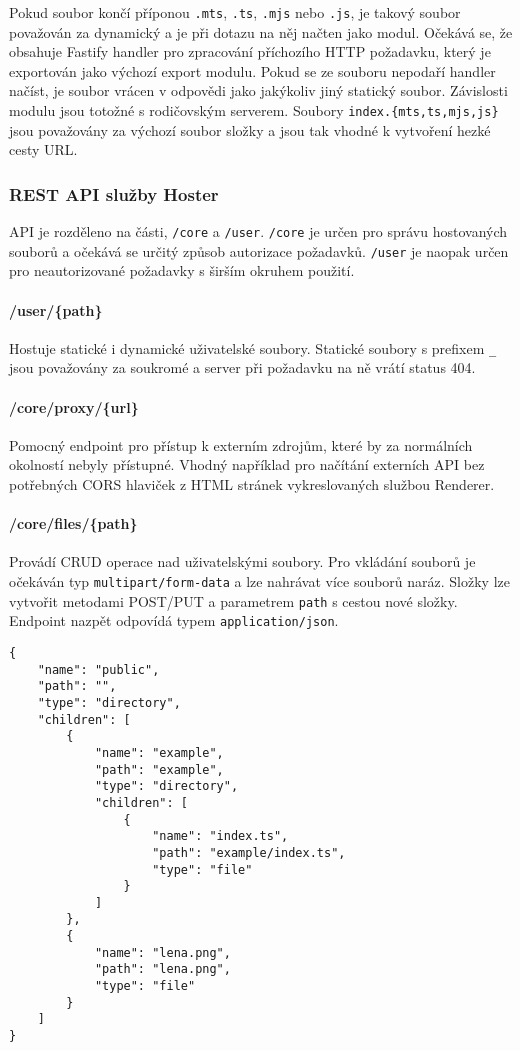 Pokud soubor končí příponou \lstinline|.mts|, \lstinline|.ts|, \lstinline|.mjs| nebo \lstinline|.js|, je takový soubor považován za dynamický a je při dotazu na něj načten jako modul. Očekává se, že obsahuje Fastify handler pro zpracování příchozího HTTP požadavku, který je exportován jako výchozí export modulu. Pokud se ze souboru nepodaří handler načíst, je soubor vrácen v odpovědi jako jakýkoliv jiný statický soubor. Závislosti modulu jsou totožné s rodičovským serverem. Soubory \lstinline|index.{mts,ts,mjs,js}| jsou považovány za výchozí soubor složky a jsou tak vhodné k vytvoření hezké cesty URL.

\subsubsection{REST API služby Hoster}
API je rozděleno na části, \lstinline|/core| a \lstinline|/user|. \lstinline|/core| je určen pro správu hostovaných souborů a očekává se určitý způsob autorizace požadavků. \lstinline|/user| je naopak určen pro neautorizované požadavky s širším okruhem použití.

\paragraph*{/user/\{path\}} Hostuje statické i dynamické uživatelské soubory. Statické soubory s prefixem \lstinline{_} jsou považovány za soukromé a server při požadavku na ně vrátí status 404.

\paragraph*{/core/proxy/\{url\}}
Pomocný endpoint pro přístup k externím zdrojům, které by za normálních okolností nebyly přístupné. Vhodný například pro načítání externích API bez potřebných CORS hlaviček z HTML stránek vykreslovaných službou Renderer.

\paragraph*{/core/files/\{path\}}
Provádí CRUD operace nad uživatelskými soubory. Pro vkládání souborů je očekáván typ \lstinline|multipart/form-data| a lze nahrávat více souborů naráz. Složky lze vytvořit metodami POST/PUT a parametrem \lstinline|path| s cestou nové složky. Endpoint nazpět odpovídá typem \lstinline|application/json|.

\begin{lstlisting}[label=src:get-files-response,caption={Odpověď na dotaz GET /core/files/}]
{
    "name": "public",
    "path": "",
    "type": "directory",
    "children": [
        {
            "name": "example",
            "path": "example",
            "type": "directory",
            "children": [
                {
                    "name": "index.ts",
                    "path": "example/index.ts",
                    "type": "file"
                }
            ]
        },
        {
            "name": "lena.png",
            "path": "lena.png",
            "type": "file"
        }
    ]
}
\end{lstlisting}

